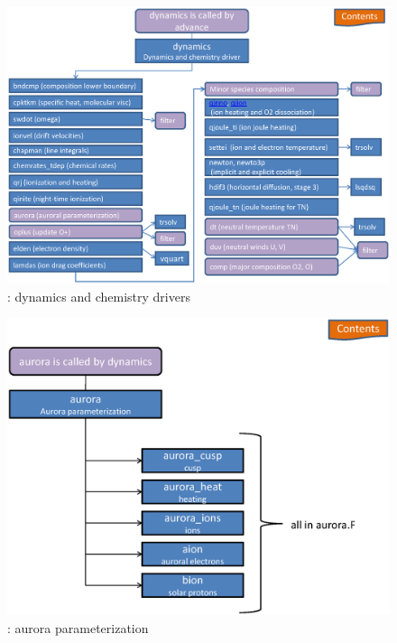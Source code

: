 %
\begin{figure}
  \centering
  \includegraphics[scale=0.7,angle=-90.]{./tex_plot/code_5.ps}
  \caption{: dynamics and chemistry drivers}
   \label{fig:code_5}
\end{figure}
%
\begin{figure}
  \centering
  \includegraphics[scale=0.7,angle=-90.]{./tex_plot/code_6.ps}
  \caption{: aurora parameterization}
   \label{fig:code_6}
\end{figure}
%
